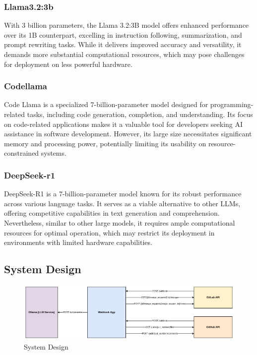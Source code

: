 \documentclass[12pt]{article}
\begin{document}
\subsubsection{Llama3.2:3b}
With 3 billion parameters, the Llama 3.2:3B model offers enhanced performance over its 1B counterpart, excelling in instruction following, summarization, and prompt rewriting tasks. While it delivers improved accuracy and versatility, it demands more substantial computational resources, which may pose challenges for deployment on less powerful hardware. \cite{ollama}

\subsubsection{Codellama}
Code Llama is a specialized 7-billion-parameter model designed for programming-related tasks, including code generation, completion, and understanding. Its focus on code-related applications makes it a valuable tool for developers seeking AI assistance in software development. However, its large size necessitates significant memory and processing power, potentially limiting its usability on resource-constrained systems. \cite{codellama}

\subsubsection{DeepSeek-r1}
DeepSeek-R1 is a 7-billion-parameter model known for its robust performance across various language tasks. It serves as a viable alternative to other LLMs, offering competitive capabilities in text generation and comprehension. Nevertheless, similar to other large models, it requires ample computational resources for optimal operation, which may restrict its deployment in environments with limited hardware capabilities. \cite{deepseek}

\subsection{System Design}
\begin{figure}[htbp]
    \centering
    \includegraphics[width=1\textwidth]{systemdesign.png}
    \caption{System Design}
    \label{fig:systemdesign}
\end{figure}
\end{document}
